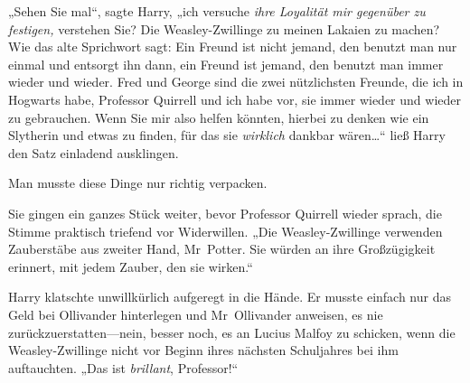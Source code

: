 „Sehen Sie mal“, sagte Harry, „ich versuche \emph{ihre Loyalität mir gegenüber zu festigen,} verstehen Sie? Die Weasley-Zwillinge zu meinen Lakaien zu machen? Wie das alte Sprichwort sagt: Ein Freund ist nicht jemand, den benutzt man nur einmal und entsorgt ihn dann, ein Freund ist jemand, den benutzt man immer wieder und wieder. Fred und George sind die zwei nützlichsten Freunde, die ich in Hogwarts habe, Professor Quirrell und ich habe vor, sie immer wieder und wieder zu gebrauchen. Wenn Sie mir also helfen könnten, hierbei zu denken wie ein Slytherin und etwas zu finden, für das sie \emph{wirklich} dankbar wären…“ ließ Harry den Satz einladend ausklingen.

Man musste diese Dinge nur richtig verpacken.

Sie gingen ein ganzes Stück weiter, bevor Professor Quirrell wieder sprach, die Stimme praktisch triefend vor Widerwillen.
„Die Weasley-Zwillinge verwenden Zauberstäbe aus zweiter Hand, Mr~Potter. Sie würden an ihre Großzügigkeit erinnert, mit jedem Zauber, den sie wirken.“

Harry klatschte unwillkürlich aufgeregt in die Hände. Er musste einfach nur das Geld bei Ollivander hinterlegen und Mr~Ollivander anweisen, es nie zurückzuerstatten—nein, besser noch, es an Lucius Malfoy zu schicken, wenn die Weasley-Zwillinge nicht vor Beginn ihres nächsten Schuljahres bei ihm auftauchten.
„Das ist \emph{brillant}, Professor!“

